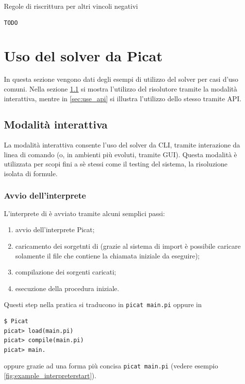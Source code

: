 \documentclass[12pt,a4paper,openright]{book} %
\begin{document}
\begin{algorithm}[H]
	\caption{Regole di riscrittura per altri vincoli negativi}
	\label{alg:othernegatives_constraints}
\end{algorithm}
\begin{verbatim}
TODO
\end{verbatim}



\chapter{Uso del solver \lset{} da Picat}
\label{ch:use}

In questa sezione vengono dati degli esempi di utilizzo del solver per
casi d'uso comuni. Nella sezione \ref{sec:use_interactive} si mostra
l'utilizzo del risolutore tramite la modalità interattiva, mentre in
\ref{sec:use_api} si illustra l'utilizzo dello stesso tramite API.

\section{Modalità interattiva}
\label{sec:use_interactive}

La modalità interattiva consente l'uso del solver da CLI, tramite
interazione da linea di comando (o, in ambienti più evoluti, tramite
GUI). Questa modalità è utilizzata per scopi fini a sè stessi come il
testing del sistema, la risoluzione isolata di formule.

\subsection{Avvio dell'interprete}

L'interprete di \lset{} è avviato tramite alcuni semplici passi:
\begin{enumerate}
	\item avvio dell'interprete Picat;
	\item caricamento dei sorgetnti di \lset{} (grazie al sistema
          di import è possibile caricare solamente il file che
          contiene la chiamata iniziale da eseguire);
	\item compilazione dei sorgenti caricati;
	\item esecuzione della procedura iniziale.
\end{enumerate}

Questi step nella pratica si traducono in \texttt{picat main.pi}
oppure in
\begin{verbatim}
$ Picat
picat> load(main.pi)
picat> compile(main.pi)
picat> main.
\end{verbatim}
oppure grazie ad una forma più concisa \texttt{picat main.pi} (vedere
esempio \ref{fig:example_interpreterstart}).
\end{document}
